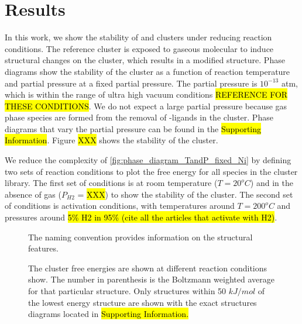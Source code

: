 \documentclass[journal=jctcce,manuscript=article]{achemso}
\begin{document}
\newpage
\section{Results}
In this work, we show the stability of  and  clusters under reducing reaction conditions. The reference cluster is exposed to gaseous molecular  to induce structural changes on the cluster, which results in a modified structure. Phase diagrams show the stability of the cluster as a function of reaction temperature and  partial pressure at a fixed  partial pressure. The  partial pressure is {$10^{-13}$} atm, which is within the range of ultra high vacuum conditions \hl{REFERENCE FOR THESE CONDITIONS}. We do not expect a large  partial pressure because gas phase  species are formed from the removal of -ligands in the cluster. Phase diagrams that vary the  partial pressure can be found in the \hl{Supporting Information}. Figure \hl{XXX} shows the stability of the  cluster. 



We reduce the complexity of \ref{fig:phase_diagram_TandP_fixed_Ni} by defining two sets of reaction conditions to plot the free energy for all species in the  cluster library. The first set of conditions is at room temperature ($T = 20 ^{o}C$) and in the absence of  gas ($P_{H2}$ = \hl{XXX}) to show the stability of the cluster. The second set of conditions is activation conditions, with temperatures around $T = 200 ^{o}C$ and pressures around \hl{5\% H2 in 95\% (cite all the articles that activate with H2)}.      

\begin{figure}
    \centering
    \caption{The  cluster free energies are shown at different reaction conditions show. The number in parenthesis is the Boltzmann weighted average for that particular structure. Only structures within 50 $kJ/mol$ of the lowest energy structure are shown with the exact structures diagrams located in \hl{Supporting Information.}} The naming convention provides information on the structural features. 
    \label{fig:diff-reaction-conditons}
\end{figure}

\end{document}
